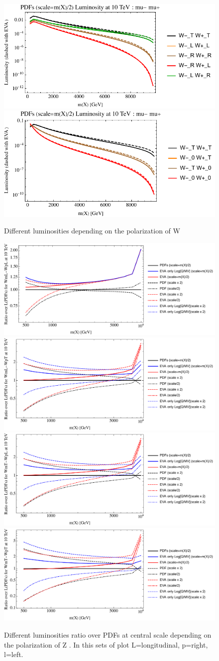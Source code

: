 \documentclass[a4paper,11pt]{article}
\begin{document}
\begin{figure}[!t]
\includegraphics[width=0.46\linewidth]{Notebooks/PlotLumi/10TeV/lumis/plotWWpolRandL.pdf}
\includegraphics[width=0.46\linewidth]{Notebooks/PlotLumi/10TeV/lumis/plotWWpolTand0.pdf}
\caption{Different luminosities depending on the polarization of W \label{fig:lumiWWpol}}
\end{figure}
 
 
 \begin{figure}[!t]
\includegraphics[width=0.46\linewidth]{Notebooks/PlotLumi/10TeV/ratios/WmL-WpL.pdf}
\includegraphics[width=0.46\linewidth]{Notebooks/PlotLumi/10TeV/ratios/WmL-WpT.pdf}
\includegraphics[width=0.46\linewidth]{Notebooks/PlotLumi/10TeV/ratios/WmT-WpL.pdf}
\includegraphics[width=0.46\linewidth]{Notebooks/PlotLumi/10TeV/ratios/WmT-WpT.pdf}
\caption{Different luminosities ratio over PDFs at central scale depending on the polarization of Z \label{fig:lumiratioWWpol}. In this sets of plot L=longitudinal, p=right, l=left.}
\end{figure}
\end{document}
